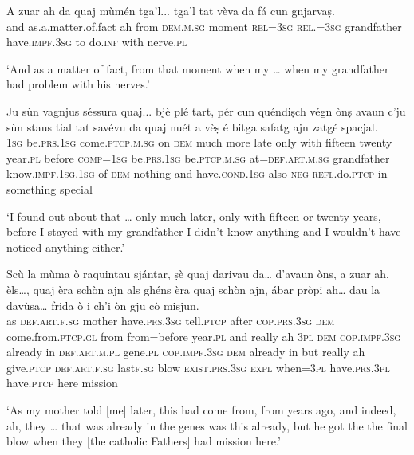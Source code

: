 \begin{linenumbers}
\gll A zuar ah da quaj mùmén tga’l... tga’l tat vèva da fá cun gnjarvaṣ. \\
and as.a.matter.of.fact ah from \textsc{dem.m.sg} moment \textsc{rel=3sg} \textsc{rel.=3sg} grandfather have.\textsc{impf.3sg} to do.\textsc{inf} with nerve.\textsc{pl} \\ 
\end{linenumbers}
\medskip
\glt `And as a matter of fact, from that moment when my … when my grandfather had problem with his nerves.'
\medskip

\begin{linenumbers}
\gll  Ju sùn vagnjus séssura quaj... bjè plé tart, pér cun quéndiṣch végn ònṣ avaun c’ju sùn staus tial tat savévu da quaj nuét a vèṣ é bitga safatg ajn zatgé spacjal.  \\
  \textsc{1sg} be.\textsc{prs.1sg} come.\textsc{ptcp.m.sg} on \textsc{dem} much more late only with fifteen twenty year.\textsc{pl} before \textsc{comp=1sg} be.\textsc{prs.1sg} be.\textsc{ptcp.m.sg} at=\textsc{def.art.m.sg} grandfather know.\textsc{impf.1sg.1sg} of \textsc{dem} nothing and have.\textsc{cond.1sg} also \textsc{neg} \textsc{refl.}do.\textsc{ptcp} in something special\\
\end{linenumbers}
\medskip
\glt `I found out about that … only much later, only with fifteen or twenty years, before I stayed with my grandfather I didn’t know anything and I wouldn’t have noticed anything either.'
\medskip

\begin{linenumbers}
\gll  Scù la mùma ò raquintau sjántar, ṣè quaj darivau da… d’avaun òns, a zuar ah, èls…, quaj èra schòn ajn als ghéns èra quaj schòn ajn, ábar pròpi ah… dau la davùsa… frida ò i ch’i òn gju cò misjun.  \\
as  \textsc{def.art.f.sg} mother have.\textsc{prs.3sg} tell.\textsc{ptcp} after \textsc{cop.prs.3sg} \textsc{dem} come.from.\textsc{ptcp.gl} from from=before year.\textsc{pl} and really ah \textsc{3pl} \textsc{dem} \textsc{cop.impf.3sg} already in \textsc{def.art.m.pl} gene.\textsc{pl} \textsc{cop.impf.3sg} \textsc{dem} already in but really ah give.\textsc{ptcp} \textsc{def.art.f.sg} last\textsc{f.sg} blow \textsc{exist.prs.3sg} \textsc{expl} when=\textsc{3pl} have.\textsc{prs.3pl} have.\textsc{ptcp} here mission  \\
\end{linenumbers}
\medskip
\glt `As my mother told [me] later, this had  come from, from years ago, and indeed, ah, they … that was already in the genes was this already, but he got the the final blow when they [the catholic Fathers] had mission here.'
\medskip

